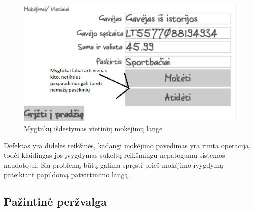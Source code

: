 \documentclass[oneside]{VUMIFPSkursinis}
\begin{document}
\begin{figure}[H]
	\includegraphics[scale=0.55]{MokejimoPatvirtinimasKlaiduPrevencija2.png}
	\caption{Mygtukų išdėstymas vietinių mokėjimų lange}
	\label{fig:klaiduPrevencijaMygtukai2}
\end{figure}
\hyperref[lentele:klaiduPrevencijaM]{Defektas} yra didelės reikšmės, kadangi mokėjimo pavedimas yra rimta operacija, todėl klaidingas jos įvygdymas sukeltų reikšmingų nepatogumų sistemos naudotojui. Šią problemą būtų galima spręsti prieš mokėjimo įvygdymą pateikiant papildomą patvirtinimo langą.
\subsection{Pažintinė peržvalga}
\end{document}
